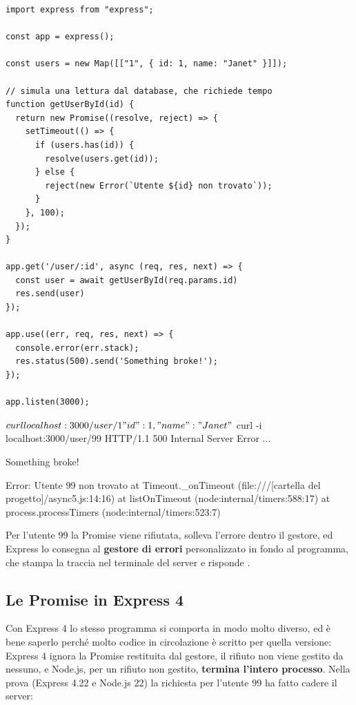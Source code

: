 \begin{affianco}[0.57]
\codicepiccolo
\begin{lstlisting}[style=js, name=async5.js]
import express from "express";

const app = express();

const users = new Map([["1", { id: 1, name: "Janet" }]]);

// simula una lettura dal database, che richiede tempo
function getUserById(id) {
  return new Promise((resolve, reject) => {
    setTimeout(() => {
      if (users.has(id)) {
        resolve(users.get(id));
      } else {
        reject(new Error(`Utente ${id} non trovato`));
      }
    }, 100);
  });
}

app.get('/user/:id', async (req, res, next) => {
  const user = await getUserById(req.params.id)
  res.send(user)
});

app.use((err, req, res, next) => {
  console.error(err.stack);
  res.status(500).send('Something broke!');
});

app.listen(3000);
\end{lstlisting}
\risultato
\begin{console}[Terminale]
$ curl localhost:3000/user/1
{"id":1,"name":"Janet"}
$ curl -i localhost:3000/user/99
HTTP/1.1 500 Internal Server Error
...

Something broke!
\end{console}
\begin{console}
Error: Utente 99 non trovato
    at Timeout._onTimeout (file:///[cartella del progetto]/async5.js:14:16)
    at listOnTimeout (node:internal/timers:588:17)
    at process.processTimers (node:internal/timers:523:7)
\end{console}
\end{affianco}

Per l'utente 99 la Promise viene rifiutata,  solleva l'errore
dentro il gestore, ed Express lo consegna al \textbf{gestore di errori}
personalizzato in fondo al programma, che stampa la traccia nel terminale del
server e risponde .

\subsection{Le Promise in Express 4}

Con Express 4 lo stesso programma si comporta in modo molto diverso, ed è bene
saperlo perché molto codice in circolazione è scritto per quella versione:
Express 4 ignora la Promise restituita dal gestore, il rifiuto non viene
gestito da nessuno, e Node.js, per un rifiuto non gestito, \textbf{termina
l'intero processo}. Nella prova (Express 4.22 e Node.js 22) la richiesta
per l'utente 99 ha fatto cadere il server:

